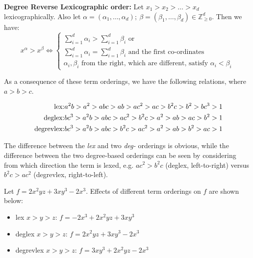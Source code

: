 \begin{Definition}
{\bf Degree Reverse Lexicographic order:} Let $x_1 > x_2 > \dots > x_d$
lexicographically. Also let $\alpha = (\alpha_1, \dots, \alpha_d);
~\beta = (\beta_1, \dots, \beta_d) \in \mathbb{Z}^d_{\geq 0}$. Then we
have: 
\begin{equation}
x^{\alpha} > x^{\beta} \iff 
\begin{cases}
\sum_{i=1}^{d}\alpha_i > \sum_{i=1}^{d} \beta_i  \text{ or }\\
\sum_{i=1}^{d}\alpha_i = \sum_{i=1}^{d} \beta_i  \text{ and the first co-ordinates}\\
\text{$\alpha_i, \beta_i$ from the right, which are different, satisfy $\alpha_i < \beta_i$}
\end{cases}
\end{equation}

\end{Definition}

As a consequence of these term orderings, we have the following relations, where $a > b > c$.

\begin{eqnarray}
    \eqntext{lex:}  
    a^2b > a^2 > abc > ab > ac^2 > ac > b^2c > b^2 > bc^3 > 1 
    \label{ex:ordering:lex}\\
    \eqntext{deglex:} 
    bc^3 > a^2b > abc > ac^2 > b^2c > a^2 > ab >
    ac > b^2 > 1
    \label{ex:ordering:deglex}\\
    \eqntext{degrevlex:}  
    bc^3 > a^2b > abc > b^2c > ac^2 > a^2 > ab >
    b^2 > ac > 1
    \label{ex:ordering:degrevlex}
\end{eqnarray}

The difference between the {\it lex} and two {\it deg-} orderings is
obvious, while the difference between the two degree-based orderings can be
seen by considering from which direction the term is lexed, e.g. $ac^2 > b^2c$ (deglex, left-to-right)
versus $b^2c > ac^2$ (degrevlex, right-to-left). 

\begin{Example}
Let $f = 2x^2yz + 3xy^3 - 2x^3$. Effects of different term orderings on $f$ are shown below:
\begin{itemize}
\item lex $x> y> z$: $f = -2x^3 + 2x^2yz + 3xy^3$
\item deglex $x>y>z$:  $f = 2x^2yz + 3xy^3 -2x^3$
\item degrevlex $x>y>z$: $f = 3xy^3 + 2x^2yz - 2x^3$
\end{itemize}
\end{Example}

